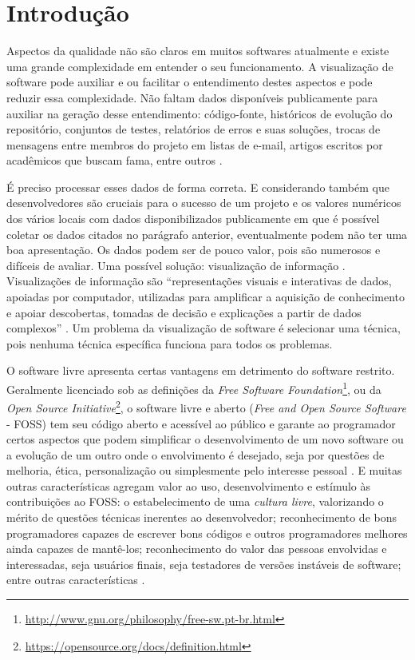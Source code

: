 \chapter{Introdução}


Aspectos da qualidade não são claros em muitos softwares atualmente e existe
uma grande complexidade em entender o seu funcionamento. A visualização de
software pode auxiliar e ou facilitar o entendimento destes aspectos e pode
reduzir essa complexidade. Não faltam dados disponíveis publicamente para
auxiliar na geração desse entendimento: código-fonte, históricos de evolução do
repositório, conjuntos de testes, relatórios de erros e suas soluções, trocas
de mensagens entre membros do projeto em listas de e-mail, artigos escritos por
acadêmicos que buscam fama, entre outros \cite{messias2012}
\cite{benkler2006wealth}.

É preciso processar esses dados de forma correta. E considerando também que
desenvolvedores são cruciais para o sucesso de um projeto e os valores
numéricos dos vários locais com dados disponibilizados publicamente em que é
possível coletar os dados citados no parágrafo anterior, eventualmente podem não ter
uma boa apresentação. Os dados podem ser de pouco valor, pois são numerosos e
difíceis de avaliar. Uma possível solução: visualização de informação
\cite{messias2012}. Visualizações de informação são ``representações visuais e
interativas de dados, apoiadas por computador, utilizadas para amplificar a
aquisição de conhecimento e apoiar descobertas, tomadas de decisão e
explicações a partir de dados complexos'' \cite{card1999readings}. Um problema
da visualização de software é selecionar uma técnica, pois nenhuma técnica
específica funciona para todos os problemas.


O software livre apresenta certas vantagens em detrimento do software restrito.
Geralmente licenciado sob as definições da
\textit{Free Software Foundation}\footnote{\url{http://www.gnu.org/philosophy/free-sw.pt-br.html}},
ou da \textit{Open Source Initiative}\footnote{\url{https://opensource.org/docs/definition.html}},
o software livre e aberto (\textit{Free and Open Source Software} - FOSS) tem
seu código aberto e acessível ao público e garante ao programador certos
aspectos que podem simplificar o desenvolvimento de um novo software ou a
evolução de um outro onde o envolvimento é desejado, seja por questões de
melhoria, ética, personalização ou simplesmente pelo interesse pessoal
\cite{meirelles2013monitoramento}. E muitas outras características agregam
valor ao uso, desenvolvimento e estímulo às contribuições ao FOSS: o
estabelecimento de uma \textit{cultura livre}, valorizando o mérito de questões
técnicas inerentes ao desenvolvedor; reconhecimento de bons programadores
capazes de escrever bons códigos e outros programadores melhores ainda capazes de
mantê-los; reconhecimento do valor das pessoas envolvidas e interessadas, seja
usuários finais, seja testadores de versões instáveis de software; entre outras
características \cite{raymond1999cathedral}.

